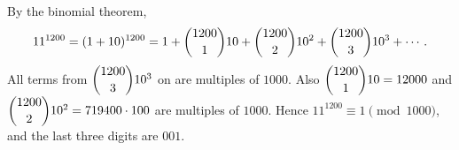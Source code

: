By the binomial theorem,
\[11^{1200}=(1+10)^{1200}=1+\dbinom{1200}{1}10+\dbinom{1200}{2}10^2+\dbinom{1200}{3}10^3+\cdots .\]
All terms from $\dbinom{1200}{3}10^3$ on are multiples of $1000$. Also $\dbinom{1200}{1}10=12000$ and $\dbinom{1200}{2}10^2=719400\cdot100$ are multiples of $1000$. Hence $11^{1200}\equiv1\pmod{1000}$, and the last three digits are $\boxed{001}$.
